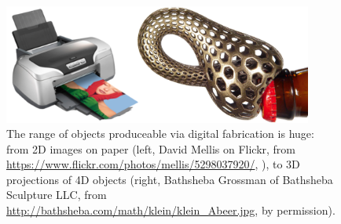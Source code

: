\begin{figure}
\centering
\includegraphics[width=4in]{figures/range.png}
\caption{The range of objects produceable via digital fabrication is huge: from 2D images on paper (left, David Mellis on Flickr, from \url{https://www.flickr.com/photos/mellis/5298037920/}, \ccby), to 3D projections of 4D objects (right, Bathsheba Grossman of Bathsheba Sculpture LLC, from \url{http://bathsheba.com/math/klein/klein_Abeer.jpg}, by permission).}
\label{fig:range}
\end{figure}

